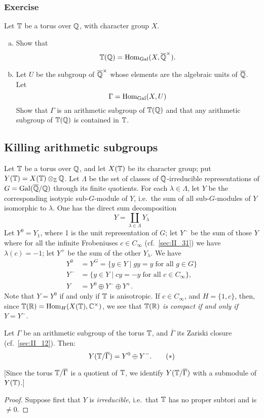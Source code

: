 \begin{subappendices}
\subsubsection*{Exercise}
\dpage
Let $\mathbb{T}$ be a torus over $\mathbb{Q}$, with character group $X$.
\begin{enumerate}[a)]
\item Show that
	\[
		\mathbb{T}(\mathbb{Q}) = \operatorname{Hom}_{\operatorname{Gal}} (X, \overline{\mathbb{Q}}^\times).
	\]
\item Let $U$ be the subgroup of $\overline{\mathbb{Q}}^\times$ whose elements are the 
algebraic units of $\overline{\mathbb{Q}}$. Let
\[
	\Gamma = \operatorname{Hom}_{\operatorname{Gal}}(X, U)
\]
Show that $\Gamma$ is an arithmetic subgroup of $\mathbb{T}(\mathbb{Q})$ and that any 
arithmetic subgroup of $\mathbb{T}(\mathbb{Q})$ is contained in $\mathbb{T}$.
\end{enumerate}

\subsection{Killing arithmetic subgroups}
\label{sec:II_A2}
Let $\mathbb{T}$ be a torus over $\mathbb{Q}$, and let $X(\mathbb{T})$ be its character group; put
$Y(\mathbb{T}) = X(\mathbb{T}) \otimes_{\mathbb{Z}} \mathbb{Q}$. Let $\Lambda$ be the set of classes of
$\mathbb{Q}$-irreducible representations of $G = \operatorname{Gal}(\overline{\mathbb{Q}}/\mathbb{Q})$ through its finite
quotients. For each $\lambda \in \Lambda$, let $Y$ be the corresponding
isotypic sub-$G$-module of $Y$, i.e.\ the sum of all sub-$G$-modules of $Y$
isomorphic to $\lambda$. One has the direct sum decomposition
\[
	Y = \coprod_{\lambda \in \Lambda} Y_\lambda
\]
Let $Y^0 = Y_1$, where 1 is the unit representation of $G$; let $Y^-$ be the
sum of those $Y$ where for all the infinite Frobeniuses $c \in C_\infty$
(cf.\ \ref{sec:II_31}) we have $\lambda(c) = -1$; let $Y^+$ be the sum of the
other $Y_\lambda$.  We have
\dpage
\begin{align*}
	Y^0 &= Y^G = \{ y \in Y \mid gy = y \; \text{for all } g\in G \} \\
	Y^- &= \{ y \in Y \mid cy = -y \; \text{for all } c\in C_\infty \}, \\
	Y   &= Y^0 \oplus Y^- \oplus Y^+.
\end{align*}
Note that $Y = Y^0$ if and only if $\mathbb{T}$ is anisotropic.  If $c \in C_\infty$,
and $H = \{ 1, c \}$, then, since $\mathbb{T}(\mathbb{R}) = \operatorname{Hom}_H(X(\mathbb{T}),\mathbb{C}^\times)$, we see
that \emph{$\mathbb{T}(\mathbb{R})$ is compact if and only if $Y = Y^-$.}

\begin{prop}
	Let $\Gamma$ be an arithmetic subgroup of the torus $\mathbb{T}$,
	and $\overline{\Gamma}$ its Zariski closure (cf.\ \ref{sec:II_12}). Then:
	\begin{equation}
		Y(\mathbb{T}/\overline{\Gamma}) = Y^0 \oplus Y^-.
		\tag{$*$}
		\label{eqn:II_A2_star}
	\end{equation}
\end{prop}
{[Since the torus $\mathbb{T}/\overline{\Gamma}$ is a quotient of $\mathbb{T}$, we identify
$Y(\mathbb{T}/\overline{\Gamma})$ with a submodule of $Y(\mathbb{T})$.]}
\begin{proof}
	Suppose first that $Y$ is \emph{irreducible}, i.e.\ that $\mathbb{T}$ has no
	proper subtori and is $\ne 0$.


\end{proof}
\end{subappendices}
